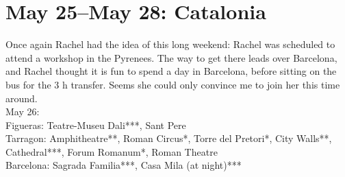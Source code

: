 \section{May 25--May 28: Catalonia}
\label{Catalonia2018}

Once again Rachel had the idea of this long weekend: Rachel was scheduled to attend a workshop in the Pyrenees. The way to get there leads over Barcelona, and Rachel thought it is fun to spend a day in Barcelona, before sitting on the bus for the 3 h transfer. Seems she could only convince me to join her this time around.\\

May 26:\\
Figueras: Teatre-Museu Dali***, Sant Pere\\
Tarragon: Amphitheatre**, Roman Circus*, Torre del Pretori*, City Walls**, Cathedral***, Forum Romanum*, Roman Theatre\\
Barcelona: Sagrada Familia***, Casa Mila (at night)***\\

